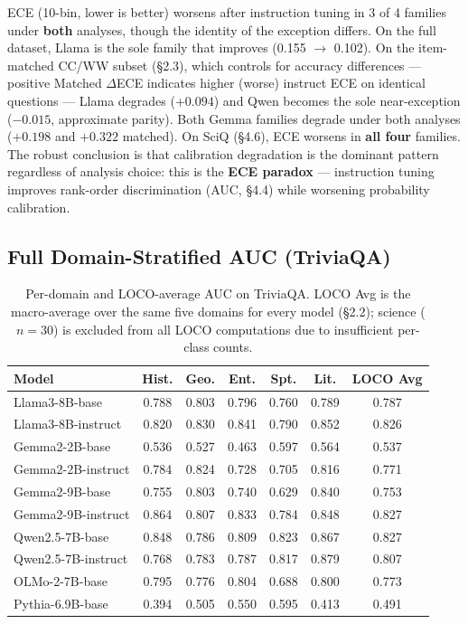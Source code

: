 \documentclass[11pt]{article}
\begin{document}
ECE (10-bin, lower is better) worsens after instruction tuning in 3 of 4 families under \textbf{both} analyses, though the identity of the exception differs. On the full dataset, Llama is the sole family that improves (0.155 $\to$ 0.102). On the item-matched CC/WW subset (\S2.3), which controls for accuracy differences --- positive Matched $\Delta$ECE indicates higher (worse) instruct ECE on identical questions --- Llama degrades ($+0.094$) and Qwen becomes the sole near-exception ($-0.015$, approximate parity). Both Gemma families degrade under both analyses ($+0.198$ and $+0.322$ matched). On SciQ (\S4.6), ECE worsens in \textbf{all four} families. The robust conclusion is that calibration degradation is the dominant pattern regardless of analysis choice: this is the \textbf{ECE paradox} --- instruction tuning improves rank-order discrimination (AUC, \S4.4) while worsening probability calibration.

\subsection{Full Domain-Stratified AUC (TriviaQA)}

\begin{table}[h]
\centering
\small
\begin{tabular}{lcccccc}
\toprule
Model & Hist. & Geo. & Ent. & Spt. & Lit. & LOCO Avg \\
\midrule
Llama3-8B-base      & 0.788 & 0.803 & 0.796 & 0.760 & 0.789 & 0.787 \\
Llama3-8B-instruct  & 0.820 & 0.830 & 0.841 & 0.790 & 0.852 & 0.826 \\
Gemma2-2B-base      & 0.536 & 0.527 & 0.463 & 0.597 & 0.564 & 0.537 \\
Gemma2-2B-instruct  & 0.784 & 0.824 & 0.728 & 0.705 & 0.816 & 0.771 \\
Gemma2-9B-base      & 0.755 & 0.803 & 0.740 & 0.629 & 0.840 & 0.753 \\
Gemma2-9B-instruct  & 0.864 & 0.807 & 0.833 & 0.784 & 0.848 & 0.827 \\
Qwen2.5-7B-base     & 0.848 & 0.786 & 0.809 & 0.823 & 0.867 & 0.827 \\
Qwen2.5-7B-instruct & 0.768 & 0.783 & 0.787 & 0.817 & 0.879 & 0.807 \\
OLMo-2-7B-base      & 0.795 & 0.776 & 0.804 & 0.688 & 0.800 & 0.773 \\
Pythia-6.9B-base    & 0.394 & 0.505 & 0.550 & 0.595 & 0.413 & 0.491 \\
\bottomrule
\end{tabular}
\caption{Per-domain and LOCO-average AUC on TriviaQA. LOCO Avg is the macro-average over the same five domains for every model (\S2.2); science ($n=30$) is excluded from all LOCO computations due to insufficient per-class counts.}
\label{tab:loco_full}
\end{table}
\end{document}
